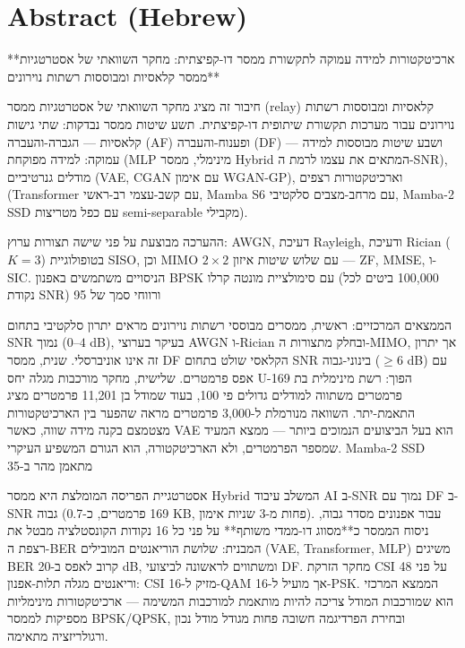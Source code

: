 \documentclass[
  english,
  12pt,
  12pt,
  a4paper,
  oneside]{report}
\begin{document}
\chapter*{Abstract (Hebrew)}\label{sec:abstract-hebrew}

\begin{flushright}
\begin{otherlanguage}{hebrew}
**ארכיטקטורות למידה עמוקה לתקשורת ממסר דו-קפיצתית: מחקר השוואתי של אסטרטגיות ממסר קלאסיות ומבוססות רשתות נוירונים**

חיבור זה מציג מחקר השוואתי של אסטרטגיות ממסר (relay) קלאסיות ומבוססות רשתות נוירונים עבור מערכות תקשורת שיתופית דו-קפיצתית. תשע שיטות ממסר נבדקות: שתי גישות קלאסיות — הגברה-והעברה (AF) ופענוח-והעברה (DF) — ושבע שיטות מבוססות למידה עמוקה: למידה מפוקחת (MLP מינימלי, ממסר Hybrid המתאים את עצמו לרמת ה-SNR), מודלים גנרטיביים (VAE, CGAN עם אימון WGAN-GP), וארכיטקטורות רצפים (Transformer עם קשב-עצמי רב-ראשי, Mamba S6 עם מרחב-מצבים סלקטיבי, Mamba-2 SSD עם כפל מטריצות semi-separable מקבילי).

ההערכה מבוצעת על פני שישה תצורות ערוץ: AWGN, דעיכת Rayleigh, ודעיכת Rician ($K=3$) בטופולוגיית SISO, וכן MIMO $2\times2$ עם שלוש שיטות איזון — ZF, MMSE, ו-SIC. הניסויים משתמשים באפנון BPSK עם סימולציית מונטה קרלו (100,000 ביטים לכל נקודת SNR) ורווחי סמך של 95%

הממצאים המרכזיים: ראשית, ממסרים מבוססי רשתות נוירונים מראים יתרון סלקטיבי בתחום SNR נמוך ($0$–$4$ dB), בעיקר בערוצי AWGN ו-Rician ובחלק מתצורות ה-MIMO, אך יתרון זה אינו אוניברסלי. שנית, ממסר DF הקלאסי שולט בתחום SNR בינוני-גבוה ($\ge6$ dB) עם אפס פרמטרים. שלישית, מחקר מורכבות מגלה יחס U-הפוך: רשת מינימלית בת 169 פרמטרים משתווה למודלים גדולים פי 100, בעוד שמודל בן 11,201 פרמטרים מציג התאמת-יתר. השוואה מנורמלת ל-3,000 פרמטרים מראה שהפער בין הארכיטקטורות מצטמצם בקנה מידה שווה, כאשר VAE הוא בעל הביצועים הנמוכים ביותר — ממצא המעיד שמספר הפרמטרים, ולא הארכיטקטורה, הוא הגורם המשפיע העיקרי. Mamba-2 SSD מתאמן מהר ב-35%

אסטרטגיית הפריסה המומלצת היא ממסר Hybrid המשלב עיבוד AI ב-SNR נמוך עם DF ב-SNR גבוה (169 פרמטרים, כ-0.7 KB, פחות מ-3 שניות אימון). עבור אפנונים מסדר גבוה, ניסוח הממסר כ**מסווג דו-ממדי משותף** על פני כל 16 נקודות הקונסטלציה מבטל את רצפת ה-BER המבנית: שלושת הוריאנטים המובילים (VAE, Transformer, MLP) משיגים BER קרוב לאפס ב-20 dB, ומשתווים לראשונה לביצועי DF. מחקר הזרקת CSI על פני 48 וריאנטים מגלה תלות-אפנון: CSI מזיק ל-16-QAM אך מועיל ל-16-PSK. הממצא המרכזי הוא שמורכבות המודל צריכה להיות מותאמת למורכבות המשימה — ארכיטקטורות מינימליות מספיקות לממסר BPSK/QPSK, ובחירת הפרדיגמה חשובה פחות מגודל מודל נכון ורגולריזציה מתאימה.
\end{otherlanguage}
\end{flushright}
\end{document}

